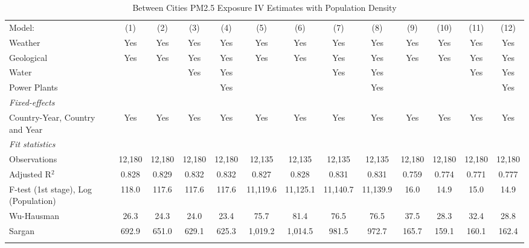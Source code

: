 
\begin{table}[htbp]
   \caption{\label{tab:iv_bet_appendix} Between Cities PM2.5 Exposure IV Estimates with Population Density}
   \centering
   \small
   \begin{tabular}{lcccccccccccc}
      \tabularnewline \midrule \midrule
      Model:                               & (1)    & (2)    & (3)    & (4)    & (5)      & (6)      & (7)      & (8)      & (9)    & (10)   & (11)   & (12)\\  
      Weather                              & Yes    & Yes    & Yes    & Yes    & Yes      & Yes      & Yes      & Yes      & Yes    & Yes    & Yes    & Yes\\  
      Geological                           & Yes    & Yes    & Yes    & Yes    & Yes      & Yes      & Yes      & Yes      & Yes    & Yes    & Yes    & Yes\\  
      Water                                &        &        & Yes    & Yes    &          &          & Yes      & Yes      &        &        & Yes    & Yes\\  
      Power Plants                         &        &        &        & Yes    &          &          &          & Yes      &        &        &        & Yes\\  
      \midrule
      \emph{Fixed-effects}\\
      Country-Year, Country and Year       & Yes    & Yes    & Yes    & Yes    & Yes      & Yes      & Yes      & Yes      & Yes    & Yes    & Yes    & Yes\\  
      \midrule
      \emph{Fit statistics}\\
      Observations                         & 12,180 & 12,180 & 12,180 & 12,180 & 12,135   & 12,135   & 12,135   & 12,135   & 12,180 & 12,180 & 12,180 & 12,180\\  
      Adjusted R$^2$                       & 0.828  & 0.829  & 0.832  & 0.832  & 0.827    & 0.828    & 0.831    & 0.831    & 0.759  & 0.774  & 0.771  & 0.777\\  
      F-test (1st stage), Log (Population) & 118.0  & 117.6  & 117.6  & 117.6  & 11,119.6 & 11,125.1 & 11,140.7 & 11,139.9 & 16.0   & 14.9   & 15.0   & 14.9\\  
      Wu-Hausman                           & 26.3   & 24.3   & 24.0   & 23.4   & 75.7     & 81.4     & 76.5     & 76.5     & 37.5   & 28.3   & 32.4   & 28.8\\  
      Sargan                               & 692.9  & 651.0  & 629.1  & 625.3  & 1,019.2  & 1,014.5  & 981.5    & 972.7    & 165.7  & 159.1  & 160.1  & 162.4\\  
      \midrule \midrule
       \\
   \end{tabular}
   

\end{table}
